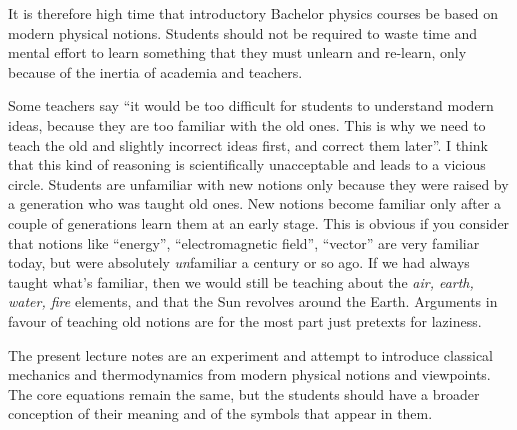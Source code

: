 \documentclass[a4paper,12pt,%
onecolumn,oneside,titlepage,%
british%
]{memoir}
\renewcommand*{\|}[1][]{\nonscript\:#1\vert\nonscript\:\mathopen{}}
\begin{document}
\medskip

It is therefore high time that introductory Bachelor physics courses be based on modern physical notions. Students should not be required to waste time and mental effort to learn something that they must unlearn and re-learn, only because of the inertia of academia and teachers.

Some teachers say \enquote{it would be too difficult for students to understand modern ideas, because they are too familiar with the old ones. This is why we need to teach the old and slightly incorrect ideas first, and correct them later}. I think that this kind of reasoning is scientifically unacceptable and leads to a vicious circle. Students are unfamiliar with new notions only because they were raised by a generation who was taught old ones. New notions become familiar only after a couple of generations learn them at an early stage. This is obvious if you consider that notions like \enquote{energy}, \enquote{electromagnetic field}, \enquote{vector} are very familiar today, but were absolutely \emph{un}familiar a century or so ago. If we had always taught what's familiar, then we would still be teaching about the \emph{air, earth, water, fire} elements, and that the Sun revolves around the Earth. Arguments in favour of teaching old notions are for the most part just pretexts for laziness.

\medskip

The present lecture notes are an experiment and attempt to introduce classical mechanics and thermodynamics from modern physical notions and viewpoints. The core equations remain the same, but the students should have a broader conception of their meaning and of the symbols that appear in them.

\end{document}
